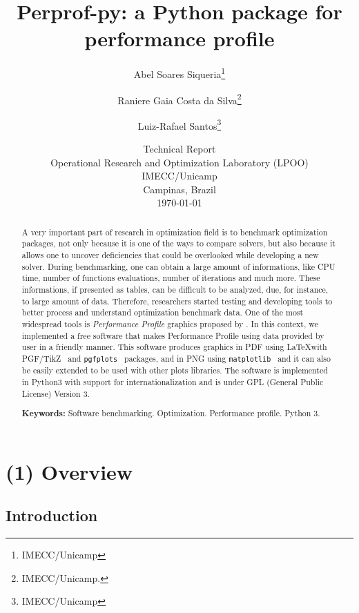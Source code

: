 \documentclass[10pt,a4paper]{article}
\begin{document}
\title{Perprof-py: a {P}ython package for performance profile}
\author{ Abel Soares Siqueria\thanks{IMECC/Unicamp}  \and Raniere Gaia Costa da Silva\thanks{IMECC/Unicamp.} \and Luiz-Rafael Santos\thanks{IMECC/Unicamp}}
\date{Technical Report \\ Operational Research and Optimization Laboratory (LPOO) \\ IMECC/Unicamp \\ Campinas, Brazil \\ \today}
\maketitle

\begin{abstract}
 A very important part of research in optimization field is to benchmark optimization packages,
not only because it is one of the ways to compare solvers, but also because it allows one to uncover
deficiencies that could be overlooked while developing a new solver. During
benchmarking, one can obtain a large amount of  informations, like CPU time, number of functions
evaluations, number of iterations and much more. These informations, if presented
as tables, can be difficult to be analyzed, due, for instance, to large amount of data.
Therefore, researchers started testing and developing tools to better process and understand optimization benchmark 
data. One of the most widespread tools is \emph{Performance Profile} graphics
proposed by \textcite{Dolan:2002du}. In this context, we implemented a free software that makes Performance Profile using data provided by user in a friendly manner. This software produces graphics in PDF using \LaTeX with PGF/TikZ~\cite{TikZ} and \texttt{pgfplots}~\cite{pgfplots} packages, and in PNG using \texttt{matplotlib}~\cite{Hunter:2007}
and it can also be easily extended to be used with other plots libraries. The software is
implemented in Python3 with support for internationalization and is under GPL (General Public License) Version 3. %

\textbf{Keywords:} Software benchmarking.  Optimization. Performance profile. Python 3.
\end{abstract}

\section*{(1) Overview}

\subsection*{Introduction} 
\end{document}
